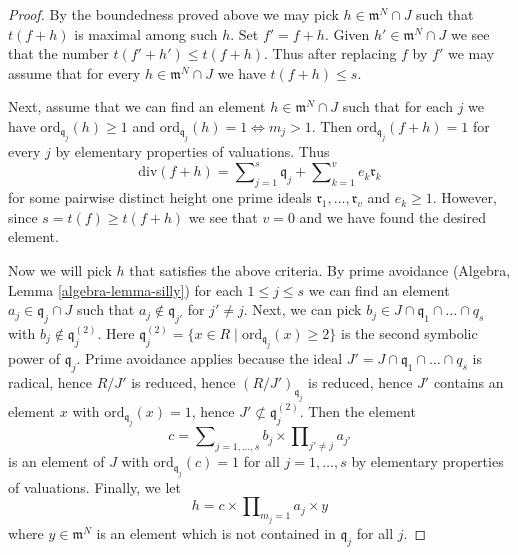 \documentclass[10pt,a4paper]{amsart}
\theoremstyle{plain}
\theoremstyle{definition}
\theoremstyle{remark}
\numberwithin{equation}{subsection}
\begin{document}
\begin{proof}
\medskip\noindent
By the boundedness proved above we may pick $h \in \mathfrak m^N \cap J$
such that $t(f + h)$ is maximal among such $h$. Set $f' = f + h$.
Given $h' \in \mathfrak m^N \cap J$
we see that the number $t(f' + h') \leq t(f + h)$.
Thus after replacing $f$ by $f'$ we may assume that for every
$h \in \mathfrak m^N \cap J$ we have $t(f + h) \leq s$.

\medskip\noindent
Next, assume that we can find an element $h \in \mathfrak m^N \cap J$
such that for each $j$ we have $\text{ord}_{\mathfrak q_j}(h) \geq 1$ and
$\text{ord}_{\mathfrak q_j}(h) = 1 \Leftrightarrow m_j > 1$.
Then $\text{ord}_{\mathfrak q_j}(f + h) = 1$
for every $j$ by elementary properties of valuations.
Thus
$$
\text{div}(f + h) = \sum\nolimits_{j = 1}^s \mathfrak q_j +
\sum\nolimits_{k = 1}^v e_k \mathfrak r_k
$$
for some pairwise distinct height one prime ideals
$\mathfrak r_1, \ldots, \mathfrak r_v$ and $e_k \geq 1$.
However, since $s = t(f) \geq t(f + h)$ we see that $v = 0$
and we have found the desired element.

\medskip\noindent
Now we will pick $h$ that satisfies the above criteria.
By prime avoidance (Algebra, Lemma \ref{algebra-lemma-silly})
for each $1 \leq j \leq s$ we can find an element
$a_j \in \mathfrak q_j \cap J$
such that $a_j \not \in \mathfrak q_{j'}$ for $j' \not = j$.
Next, we can pick $b_j \in J \cap \mathfrak q_1 \cap \ldots \cap q_s$
with $b_j \not \in \mathfrak q_j^{(2)}$. Here
$\mathfrak q_j^{(2)} = \{x \in R \mid \text{ord}_{\mathfrak q_j}(x) \geq 2\}$
is the second symbolic power of $\mathfrak q_j$.
Prime avoidance applies because the ideal
$J' = J \cap \mathfrak q_1 \cap \ldots \cap q_s$
is radical, hence $R/J'$ is reduced, hence $(R/J')_{\mathfrak q_j}$
is reduced, hence $J'$ contains an element $x$ with
$\text{ord}_{\mathfrak q_j}(x) = 1$, hence
$J' \not \subset \mathfrak q_j^{(2)}$. Then the element
$$
c = \sum\nolimits_{j = 1, \ldots, s}
b_j \times \prod\nolimits_{j' \not = j} a_{j'}
$$
is an element of $J$
with $\text{ord}_{\mathfrak q_j}(c) = 1$ for all $j = 1, \ldots, s$
by elementary properties of valuations. Finally, we let
$$
h = c \times \prod\nolimits_{m_j = 1} a_j \times y
$$
where $y \in \mathfrak m^N$ is an element
which is not contained in $\mathfrak q_j$ for all $j$.
\end{proof}
\end{document}
